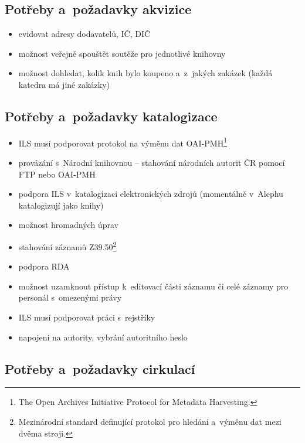 \documentclass[
	11pt, oneside, printed, final, palatino
	microtype,
	table,   %
	lof,     %
	lot     %
]{fithesis3}
\begin{document}
{\subsection{Potřeby a~požadavky akvizice}

\begin{itemize}
\item evidovat adresy dodavatelů, IČ, DIČ
\item možnost veřejně spouštět soutěže pro jednotlivé knihovny
\item možnost dohledat, kolik knih bylo koupeno a~z~jakých zakázek (každá katedra má jiné zakázky)
\end{itemize}

\subsection{Potřeby a~požadavky katalogizace}

\begin{itemize}
\item ILS musí podporovat protokol na výměnu dat OAI-PMH\footnote{The Open Archives Initiative Protocol for Metadata Harvesting.}
\item provázání s~Národní knihovnou – stahování národních autorit ČR pomocí FTP nebo OAI-PMH
\item podpora ILS v~katalogizaci elektronických zdrojů (momentálně v~Alephu katalogizují jako knihy)
\item možnost hromadných úprav
\item stahování záznamů Z39.50\footnote{Mezinárodní standard definující protokol pro hledání a~výměnu dat mezi dvěma stroji.}
\item podpora RDA
\item možnost uzamknout přístup k~editovací části záznamu či celé záznamy pro personál s~omezenými právy
\item ILS musí podporovat práci s~rejstříky
\item napojení na autority, vybrání autoritního heslo
\end{itemize}

\subsection{Potřeby a~požadavky cirkulací}

}
\end{document}

